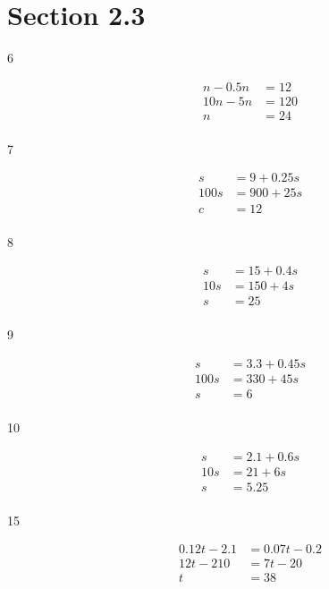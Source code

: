 \documentclass[letterpaper, landscape]{exam}
\begin{document}
  \ifprintanswers{}
      
    \section{Section 2.3}

    \begin{description}

      \item[6]
        \begin{align*}
          n - 0.5n & = 12 \\
          10n - 5n & = 120 \\
          n        & = \boxed{ 24 } \\
        \end{align*}

      \item[7]
        \begin{align*}
          s     & = 9 + 0.25 s \\
          100 s & = 900 + 25 s \\
          c     & = \boxed{ 12 } \\
        \end{align*}

      \item[8]
        \begin{align*}
          s   & = 15 + 0.4s \\
          10s & = 150 + 4s \\
          s   & = \boxed{ 25 } \\
        \end{align*}

      \item[9]
        \begin{align*}
          s    & = 3.3 + 0.45s \\
          100s & = 330 + 45 s \\
          s    & = \boxed{ 6 } \\
        \end{align*}

      \item[10]
        \begin{align*}
          s   & = 2.1 + 0.6s \\
          10s & = 21 + 6s \\
          s   & = \boxed{ 5.25 } \\
        \end{align*}

      \item[15]
        \begin{align*}
          0.12t - 2.1 & = 0.07t - 0.2 \\
          12t - 210   & = 7t - 20 \\
          t           & = \boxed{ 38 } \\
        \end{align*}


\end{description}
\end{document}

